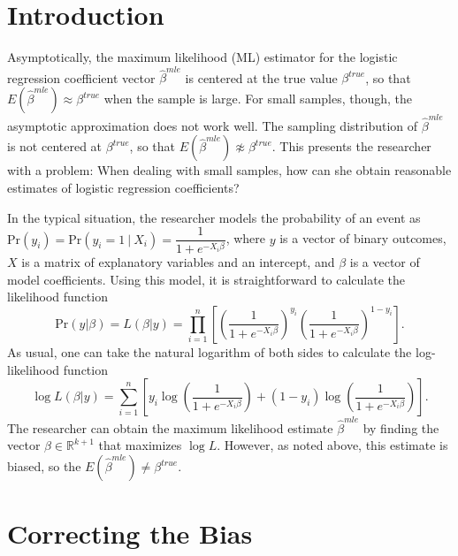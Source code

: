 \documentclass[12pt]{article}
\begin{document}

\section*{Introduction}

Asymptotically, the maximum likelihood (ML) estimator for the logistic regression coefficient vector $\hat{\beta}^{mle}$ is centered at the true value $\beta^{true}$, so that $E(\hat{\beta}^{mle}) \approx \beta^{true}$ when the sample is large.
For small samples, though, the asymptotic approximation does not work well. The sampling distribution of $\hat{\beta}^{mle}$ is not centered at $\beta^{true}$, so that $E(\hat{\beta}^{mle}) \not\approx \beta^{true}$. 
This presents the researcher with a problem: When dealing with small samples, how can she obtain reasonable estimates of logistic regression coefficients?

In the typical situation, the researcher models the probability of an event as $\text{Pr}(y_i) = \text{Pr}(y_i = 1~|~ X_i) = \dfrac{1}{1 + e^{-X_i\beta}}$, where $y$ is a vector of binary outcomes, $X$ is a matrix of explanatory variables and an intercept, and $\beta$ is a vector of model coefficients. 
Using this model, it is straightforward to calculate the likelihood function 
\begin{equation}\nonumber
\text{Pr}(y | \beta) = L(\beta | y) = \displaystyle \prod_{i = 1}^n \left[\left( \dfrac{1}{1 + e^{-X_i\beta}}\right)^{y_i}\left( \dfrac{1}{1 + e^{-X_i\beta}}\right)^{1 - y_i}\right]\text{.}
\end{equation}
\noindent As usual, one can take the natural logarithm of both sides to calculate the log-likelihood function 
\begin{equation}\nonumber
\log L(\beta | y) = \displaystyle \sum_{i = 1}^n \left[y_i \log \left( \dfrac{1}{1 + e^{-X_i\beta}}\right) + (1 - y_i) \log \left( \dfrac{1}{1 + e^{-X_i\beta}}\right)\right].
\end{equation}
\noindent The researcher can obtain the maximum likelihood estimate $\hat{\beta}^{mle}$ by finding the vector $\beta \in \mathbb{R}^{k + 1}$ that maximizes $\log L$. 
However, as noted above, this estimate is biased, so the $E(\hat{\beta}^{mle}) \neq \beta^{true}$.

\section*{Correcting the Bias}
\end{document}
